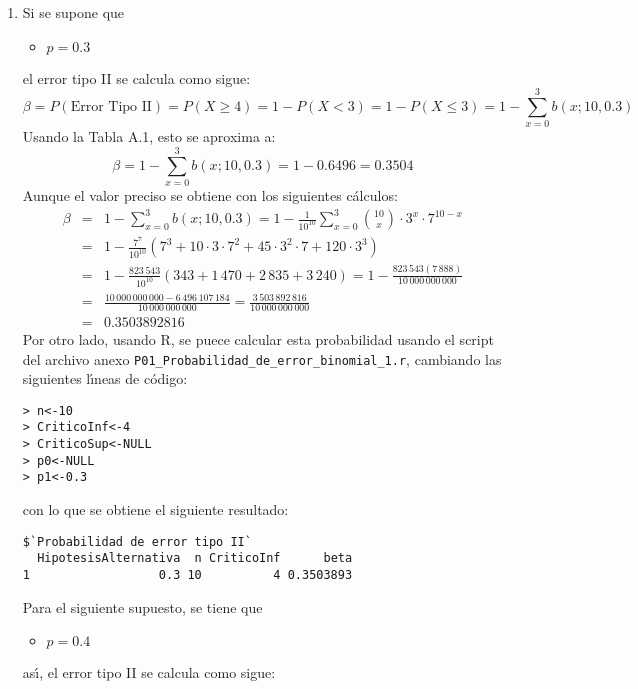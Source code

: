 \begin{solucion}
\begin{enumerate}
  \item Si se supone que
  \begin{itemize}
   \item $p = 0.3$
  \end{itemize}
  el error tipo II se calcula como sigue:
  \begin{equation*}
   \beta = P(\text{Error Tipo II}) = P(X \geq 4) = 1 - P(X < 3) = 1 - P(X \leq 3) = 1 - \sum_{x = 0}^{3} b(x;10,0.3)
  \end{equation*}
  Usando la Tabla A.1, esto se aproxima a:
  \begin{equation*}
   \beta = 1 - \sum_{x = 0}^{3} b(x;10,0.3) = 1 - 0.6496 = 0.3504
  \end{equation*}
  Aunque el valor preciso se obtiene con los siguientes c\'alculos:
  \begin{eqnarray*}
   \beta & = & 1 - \sum_{x = 0}^{3} b(x;10,0.3) = 1 - \frac{1}{10^{10}} \sum_{x=0}^{3} \binom{10}{x}\cdot 3^x\cdot 7^{10-x} \\
   & = & 1 - \frac{7^7}{10^{10}}\left( 7^3 + 10 \cdot 3 \cdot 7^2 + 45 \cdot 3^2 \cdot 7 + 120 \cdot 3^3 \right) \\
   & = & 1- \frac{823\,543}{10^{10}}(343 + 1\,470 + 2\,835 + 3\,240) = 1 - \frac{823\,543(7\,888)}{10\,000\,000\,000} \\
   & = & \frac{10\,000\,000\,000 - 6\,496\,107\,184}{10\,000\,000\,000} = \frac{3\,503\,892\,816}{10\,000\,000\,000} \\
   & = & 0.3503892816
  \end{eqnarray*}
  Por otro lado, usando R, se puece calcular esta probabilidad usando el script del archivo anexo \texttt{P01\_Probabilidad\_de\_error\_binomial\_1.r}, cambiando las siguientes l\'{\i}neas de c\'odigo:
  \begin{verbatim}
> n<-10
> CriticoInf<-4
> CriticoSup<-NULL
> p0<-NULL
> p1<-0.3
  \end{verbatim}
  \vspace{-0.5cm}
  con lo que se obtiene el siguiente resultado:
  \begin{verbatim}
$`Probabilidad de error tipo II`
  HipotesisAlternativa  n CriticoInf      beta
1                  0.3 10          4 0.3503893
  \end{verbatim}
  \vspace{-0.5cm}
  Para el siguiente supuesto, se tiene que
  \begin{itemize}
   \item $p=0.4$
  \end{itemize}
  as\'{\i}, el error tipo II se calcula como sigue:

\end{enumerate}
\end{solucion}
